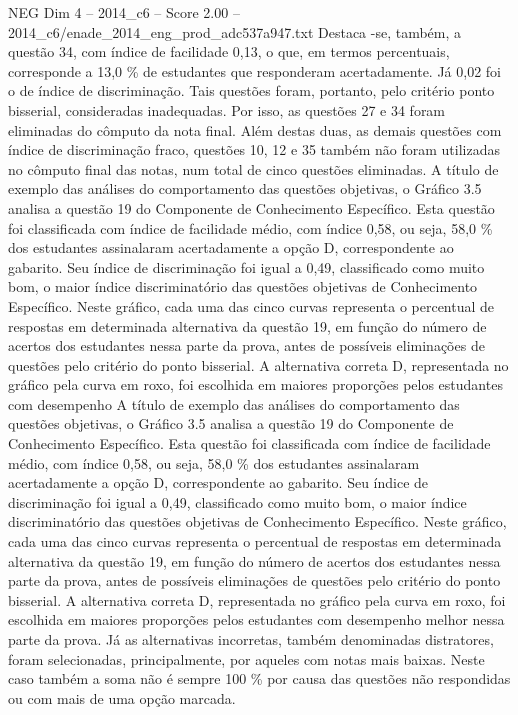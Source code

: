 \begin{textsample}{NEG Dim 4 – 2014\_c6 – Score 2.00 – 2014\_c6/enade\_2014\_eng\_prod\_adc537a947.txt}
Destaca -se, também, a questão 34, com índice de facilidade 0,13, o que, em termos percentuais, corresponde a 13,0 \% de estudantes que responderam acertadamente.
Já 0,02 foi o de índice de discriminação.
Tais questões foram, portanto, pelo critério ponto bisserial, consideradas inadequadas.
Por isso, as questões 27 e 34 foram eliminadas do cômputo da nota final.
Além destas duas, as demais questões com índice de discriminação fraco, questões 10, 12 e 35 também não foram utilizadas no cômputo final das notas, num total de cinco questões eliminadas.
A título de exemplo das análises do comportamento das questões objetivas, o Gráfico 3.5 analisa a questão 19 do Componente de Conhecimento Específico.
Esta questão foi classificada com índice de facilidade médio, com índice 0,58, ou seja, 58,0 \% dos estudantes assinalaram acertadamente a opção D, correspondente ao gabarito.
Seu índice de discriminação foi igual a 0,49, classificado como muito bom, o maior índice discriminatório das questões objetivas de Conhecimento Específico.
Neste gráfico, cada uma das cinco curvas representa o percentual de respostas em determinada alternativa da questão 19, em função do número de acertos dos estudantes nessa parte da prova, antes de possíveis eliminações de questões pelo critério do ponto bisserial.
A alternativa correta D, representada no gráfico pela curva em roxo, foi escolhida em maiores proporções pelos estudantes com desempenho A título de exemplo das análises do comportamento das questões objetivas, o Gráfico 3.5 analisa a questão 19 do Componente de Conhecimento Específico.
Esta questão foi classificada com índice de facilidade médio, com índice 0,58, ou seja, 58,0 \% dos estudantes assinalaram acertadamente a opção D, correspondente ao gabarito.
Seu índice de discriminação foi igual a 0,49, classificado como muito bom, o maior índice discriminatório das questões objetivas de Conhecimento Específico.
Neste gráfico, cada uma das cinco curvas representa o percentual de respostas em determinada alternativa da questão 19, em função do número de acertos dos estudantes nessa parte da prova, antes de possíveis eliminações de questões pelo critério do ponto bisserial.
A alternativa correta D, representada no gráfico pela curva em roxo, foi escolhida em maiores proporções pelos estudantes com desempenho melhor nessa parte da prova.
Já as alternativas incorretas, também denominadas distratores, foram selecionadas, principalmente, por aqueles com notas mais baixas.
Neste caso também a soma não é sempre 100 \% por causa das questões não respondidas ou com mais de uma opção marcada.

\end{textsample}
